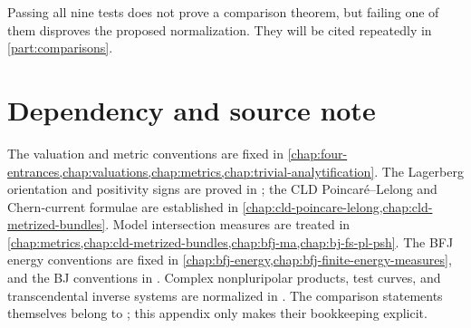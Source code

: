 Passing all nine tests does not prove a comparison theorem, but failing one
of them disproves the proposed normalization.  They will be cited repeatedly
in \cref{part:comparisons}.

\section*{Dependency and source note}
\label{sec:appJ-sources}

The valuation and metric conventions are fixed in
\cref{chap:four-entrances,chap:valuations,chap:metrics,chap:trivial-analytification}.
The Lagerberg orientation and positivity signs are proved in
;
the CLD Poincar\'e--Lelong and Chern-current formulae are established in
\cref{chap:cld-poincare-lelong,chap:cld-metrized-bundles}.  Model intersection
measures are treated in
\cref{chap:metrics,chap:cld-metrized-bundles,chap:bfj-ma,chap:bj-fs-pl-psh}.
The BFJ energy conventions are fixed in
\cref{chap:bfj-energy,chap:bfj-finite-energy-measures}, and the BJ conventions
in .  Complex nonpluripolar
products, test curves, and transcendental inverse systems are normalized in
.  The
comparison statements themselves belong to
; this appendix
only makes their bookkeeping explicit.
